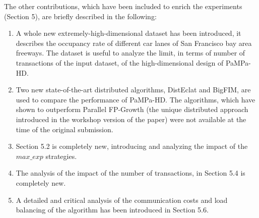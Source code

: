 \documentclass[12pt, onecolumn,letterpaper]{article}
\begin{document}
The other contributions, which have been included to enrich the experiments
(Section 5), are briefly described in the following:
\begin{enumerate}
\item A whole new extremely-high-dimensional dataset has been introduced, it
describes the occupancy rate of different car lanes of San Francisco bay area
freeways. The dataset is useful to analyze the limit, in terms of number of
transactions of the input dataset, of the high-dimensional design of PaMPa-HD.
\item Two new state-of-the-art distributed algorithms, DistEclat and BigFIM, are
used to compare the performance of PaMPa-HD. The algorithms, which have shown to
outperform Parallel FP-Growth (the unique distributed approach introduced in the
workshop version of the paper) were not available at the time of the original
submission.
\item Section 5.2 is completely new, introducing and analyzing the impact of the
$max\_exp$ strategies.
\item The analysis of the impact of the number of transactions, in Section 5.4
is completely new.
\item A detailed and critical analysis of the communication costs and load
balancing of the algorithm has been introduced in Section 5.6.
\end{enumerate}
\end{document}

